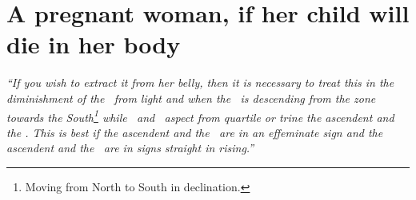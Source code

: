 \section{A pregnant woman, if her child will die in her body}
\textsl{``If you wish to extract it from her belly, then it is necessary to treat this in the diminishment of the \Moon\, from light and when the \Moon\, is descending from the zone towards the South\footnote{Moving from North to South in declination.} while \Mars\, and \Venus\, aspect from quartile or trine the ascendent and the \Moon. This is best if the ascendent and the \Moon\, are in an effeminate sign and the ascendent and the \Moon\, are in signs straight in rising.''}